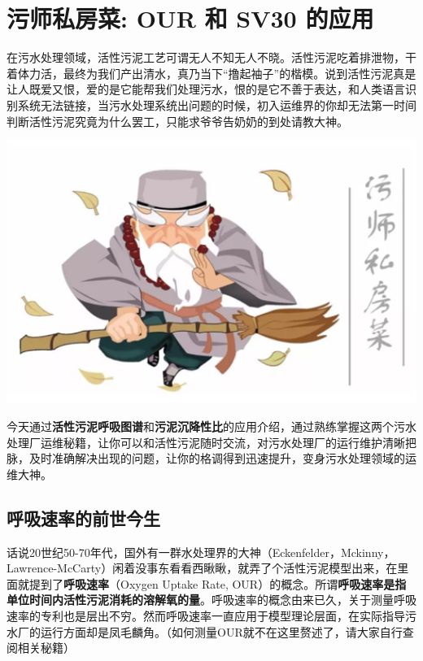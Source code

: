 \documentclass[]{book}
\begin{document}
\hypertarget{ux6c61ux5e08ux79c1ux623fux83dc-our-ux548c-sv30-ux7684ux5e94ux7528}{%
\section{污师私房菜: OUR 和 SV30 的应用}\label{ux6c61ux5e08ux79c1ux623fux83dc-our-ux548c-sv30-ux7684ux5e94ux7528}}

在污水处理领域，活性污泥工艺可谓无人不知无人不晓。活性污泥吃着排泄物，干着体力活，最终为我们产出清水，真乃当下``撸起袖子''的楷模。说到活性污泥真是让人既爱又恨，爱的是它能帮我们处理污水，恨的是它不善于表达，和人类语言识别系统无法链接，当污水处理系统出问题的时候，初入运维界的你却无法第一时间判断活性污泥究竟为什么罢工，只能求爷爷告奶奶的到处请教大神。

\includegraphics[width=6.67in]{images/os1}

今天通过\textbf{活性污泥呼吸图谱}和\textbf{污泥沉降性比}的应用介绍，通过熟练掌握这两个污水处理厂运维秘籍，让你可以和活性污泥随时交流，对污水处理厂的运行维护清晰把脉，及时准确解决出现的问题，让你的格调得到迅速提升，变身污水处理领域的运维大神。

\hypertarget{ux547cux5438ux901fux7387ux7684ux524dux4e16ux4ecaux751f}{%
\subsection{呼吸速率的前世今生}\label{ux547cux5438ux901fux7387ux7684ux524dux4e16ux4ecaux751f}}

话说20世纪50-70年代，国外有一群水处理界的大神（Eckenfelder，Mckinny，Lawrence-McCarty）闲着没事东看看西瞅瞅，就弄了个活性污泥模型出来，在里面就提到了\textbf{呼吸速率}（Oxygen Uptake Rate, OUR）的概念。所谓\textbf{呼吸速率是指单位时间内活性污泥消耗的溶解氧的量}。呼吸速率的概念由来已久，关于测量呼吸速率的专利也是层出不穷。然而呼吸速率一直应用于模型理论层面，在实际指导污水厂的运行方面却是凤毛麟角。（如何测量OUR就不在这里赘述了，请大家自行查阅相关秘籍）
\end{document}
